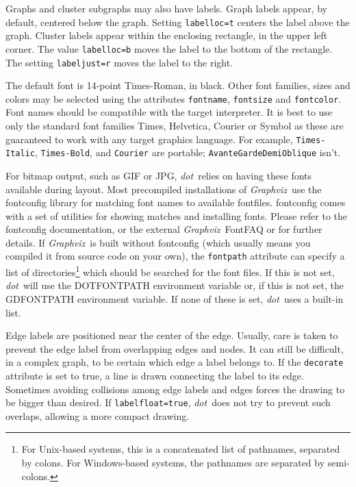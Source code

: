 \documentclass[11pt]{article}
\def\dot{{\it dot}}
\def\graphviz{{\it Graphviz}}
\begin{document}
{%

Graphs and cluster subgraphs may also have labels. Graph labels
appear, by default, centered below the graph. Setting {\tt labelloc=t}
centers the label above the graph. Cluster labels appear within the
enclosing rectangle, in the upper left corner. The value {\tt labelloc=b}
moves the label to the bottom of the rectangle. The setting
{\tt labeljust=r} moves the label to the right.

The default font is 14-point Times-Roman, in black.
Other font families, sizes and colors may be selected using the
attributes {\tt fontname}, {\tt fontsize} and {\tt fontcolor}.
Font names should be compatible with the target interpreter.
It is best to use only the standard font families
Times, Helvetica, Courier or Symbol as these are guaranteed to work
with any target graphics language.
For example, \verb"Times-Italic", \verb"Times-Bold", and \verb"Courier"
are portable; {\tt AvanteGarde\-DemiOblique} isn't.

For bitmap output, such as GIF or JPG, \dot\ relies on having these
fonts available during layout. Most precompiled installations of
\graphviz\ use the fontconfig library for matching font names to
available fontfiles. fontconfig comes with a set of utilities for
showing matches and installing fonts. Please refer to the fontconfig
documentation, or the external \graphviz\ FontFAQ or for further details.
If \graphviz\ is built without fontconfig (which usually means you
compiled it from source code on your own), the {\tt fontpath} attribute
can specify a list of directories\footnote{For Unix-based systems, this is
a concatenated list of pathnames, separated by colons. For Windows-based
systems, the pathnames are separated by semi-colons.} which should be 
searched for the font files. If this is not set, 
\dot\ will use the DOTFONTPATH environment variable or, if this is not
set, the GDFONTPATH environment variable. If none of these is set, \dot\
uses a built-in list.

Edge labels are positioned near the center of the edge. Usually, care
is taken to prevent the edge label from overlapping edges and
nodes. It can still be difficult, in a complex graph, to be certain
which edge a label belongs to. If the {\tt decorate} attribute is set
to true, a line is drawn connecting the label to its edge. Sometimes
avoiding collisions among edge labels and edges forces the
drawing to be bigger than desired. If {\tt labelfloat=true}, 
\dot\ does not try to prevent such overlaps, allowing a more compact
drawing.

}
\end{document}
